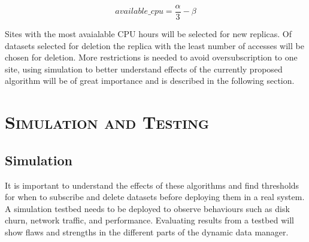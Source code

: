 \documentclass[11pt,a4page]{article}
\begin{document}
    \begin{equation}\label{eq:avail_cpu}
      available\_cpu = \frac{\alpha}{3} - \beta
    \end{equation}

    Sites with the most avaialable CPU hours will be selected for new replicas. Of datasets selected for deletion the replica with the least number of accesses will be chosen for deletion. More restrictions is needed to avoid oversubscription to one site, using simulation to better understand effects of the currently proposed algorithm will be of great importance and is described in the following section.


\section{\textsc{Simulation and Testing}}
  \subsection{Simulation}
    It is important to understand the effects of these algorithms and find thresholds for when to subscribe and delete datasets before deploying them in a real system. A simulation testbed needs to be deployed to observe behaviours such as disk churn, network traffic, and performance. Evaluating results from a testbed will show flaws and strengths in the different parts of the dynamic data manager.
\end{document}
